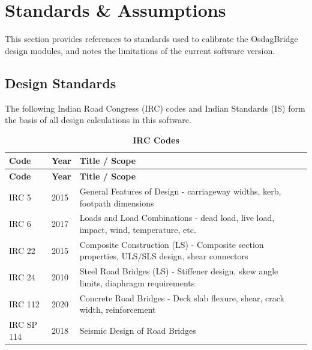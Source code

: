 \documentclass[12pt,a4paper]{report}
\numberwithin{table}{chapter}
\numberwithin{figure}{chapter}
\newcommand{\ReportTableSetup}{%
  \setlength{\tabcolsep}{3.0pt}%
  \renewcommand{\arraystretch}{1.18}%
  \setlength{\arrayrulewidth}{0.4pt}\setlength{\extrarowheight}{0.5pt}%
  \setlength{\LTleft}{\fill}\setlength{\LTright}{\fill}%
  \setlength{\LTpre}{4pt}\setlength{\LTpost}{8pt}}
\newcommand{\ReportTableFont}{\small}
\newcommand{\ReportTableGap}{\vspace{0.5em}}
\begin{document}
\chapter{Standards \& Assumptions}
\label{ch:Design Standards}

This section provides references to standards used to calibrate the OsdagBridge
design modules, and notes the limitations of the current software version.

\section{Design Standards}
\label{sec:design_standards}

The following Indian Road Congress (IRC) codes and Indian Standards (IS) 
form the basis of all design calculations in this software.

\ReportTableGap


\begingroup
\ReportTableSetup
\ReportTableFont
\begin{longtable}{|C{1.9131cm}|C{1.9131cm}|p{12.4350cm}|}

\caption{\textbf{IRC Codes}}\\

\hline
\textbf{Code} & \textbf{Year} & \textbf{Title / Scope} \\ 
\hline
\endfirsthead
\hline
\textbf{Code} & \textbf{Year} & \textbf{Title / Scope} \\ 
\hline
\endhead
\hline
\endfoot
\hline
\endlastfoot

IRC 5 & 2015 & General Features of Design - carriageway widths, kerb, footpath dimensions \\ 
\hline
IRC 6 & 2017 & Loads and Load Combinations - dead load, live load, impact, wind, temperature, etc. \\ 
\hline
IRC 22 & 2015 & Composite Construction (LS) - Composite section properties, ULS/SLS design, shear connectors \\ 
\hline
IRC 24 & 2010 & Steel Road Bridges (LS) - Stiffener design, skew angle limits, diaphragm requirements \\ 
\hline
IRC 112 & 2020 & Concrete Road Bridges - Deck slab flexure, shear, crack width, reinforcement \\ 
\hline
IRC SP 114 & 2018 & Seismic Design of Road Bridges \\ 
\hline
\end{longtable}
\endgroup
\end{document}
